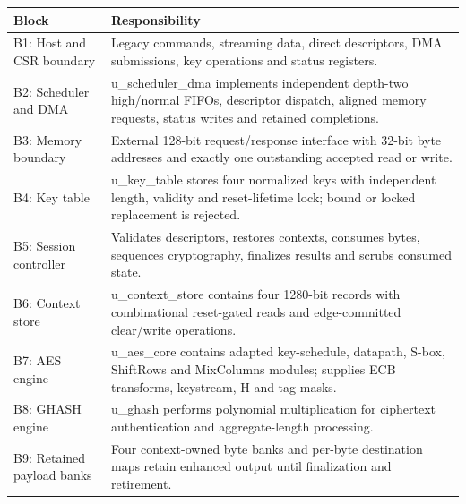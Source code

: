 \documentclass[11pt,a4paper]{article}
\begin{document}
{\small\renewcommand{\arraystretch}{1.18}\begin{longtable}{@{}L{0.24\textwidth}|L{0.7\textwidth}@{}}\toprule

\textbf{Block} & \textbf{Responsibility}\\\midrule\endhead

B1: Host and CSR boundary & Legacy commands,\allowbreak{} streaming data,\allowbreak{} direct descriptors,\allowbreak{} DMA submissions,\allowbreak{} key operations and status registers.\\[2pt]\hline

B2: Scheduler and DMA & u\_\allowbreak{}scheduler\_\allowbreak{}dma implements independent depth-two high/\allowbreak{}normal FIFOs,\allowbreak{} descriptor dispatch,\allowbreak{} aligned memory requests,\allowbreak{} status writes and retained completions.\\[2pt]\hline

B3: Memory boundary & External 128-bit request/\allowbreak{}response interface with 32-bit byte addresses and exactly one outstanding accepted read or write.\\[2pt]\hline

B4: Key table & u\_\allowbreak{}key\_\allowbreak{}table stores four normalized keys with independent length,\allowbreak{} validity and reset-lifetime lock; bound or locked replacement is rejected.\\[2pt]\hline

B5: Session controller & Validates descriptors,\allowbreak{} restores contexts,\allowbreak{} consumes bytes,\allowbreak{} sequences cryptography,\allowbreak{} finalizes results and scrubs consumed state.\\[2pt]\hline

B6: Context store & u\_\allowbreak{}context\_\allowbreak{}store contains four 1280-bit records with combinational reset-gated reads and edge-committed clear/\allowbreak{}write operations.\\[2pt]\hline

B7: AES engine & u\_\allowbreak{}aes\_\allowbreak{}core contains adapted key-schedule,\allowbreak{} datapath,\allowbreak{} S-box,\allowbreak{} ShiftRows and MixColumns modules; supplies ECB transforms,\allowbreak{} keystream,\allowbreak{} H and tag masks.\\[2pt]\hline

B8: GHASH engine & u\_\allowbreak{}ghash performs polynomial multiplication for ciphertext authentication and aggregate-length processing.\\[2pt]\hline

B9: Retained payload banks & Four context-owned byte banks and per-byte destination maps retain enhanced output until finalization and retirement.\\[2pt]\hline

\bottomrule\end{longtable}}
\end{document}
